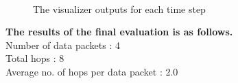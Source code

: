 \documentclass[a4paper,11pt]{article}%
\begin{document}
\begin{figure}[!h]
{	}\hfill
	\hfill
	\\
	\caption{The visualizer outputs for each time step}
\end{figure}


\textbf{The results of the final evaluation is as follows.}\\

Number of data packets : 4\\
Total hops : 8\\
Average no. of hops per data packet : 2.0\\
\end{document}

